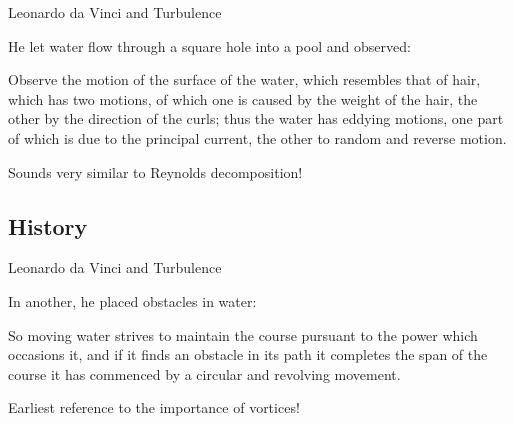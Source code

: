 
\begin{frame}{Leonardo da Vinci and Turbulence}
  \setlength{\fboxsep}{0pt}
  \setlength{\fboxrule}{1pt}
  \begin{figure}[H]
  \centering
  \end{figure}
  
  He let water flow through a square hole into a pool and observed:
      \begin{fancyquotes}
      Observe the motion of the surface of the water, which resembles that of hair, which has two motions, of which one is caused by the weight of the hair, the other by the direction of the curls; thus the water has eddying motions, one part of which is due to the principal current, the other to random and reverse motion.	
      \end{fancyquotes}

Sounds very similar to Reynolds decomposition!

\end{frame}

\subsection{History}
\begin{frame}{Leonardo da Vinci and Turbulence}
  \setlength{\fboxsep}{0pt}
  \setlength{\fboxrule}{1pt}
  \begin{figure}[H]
  \centering
  \end{figure}
  
  In another, he placed obstacles in water:
      \begin{fancyquotes}
      So moving water strives to maintain the course pursuant to the power which occasions it, and if it finds an obstacle in its path it completes the span of the course it has commenced by a circular and revolving movement.	
      \end{fancyquotes}
Earliest reference to the importance of vortices!
\end{frame}

